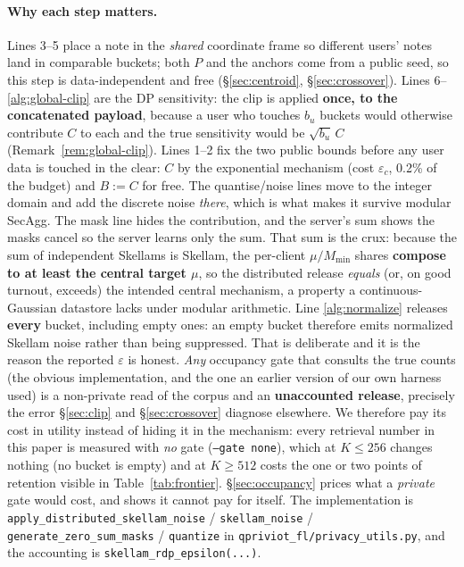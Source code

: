 \documentclass[pdflatex,sn-mathphys-num,iicol]{sn-jnl}
\theoremstyle{thmstyleone}%
\theoremstyle{thmstyletwo}%
\theoremstyle{thmstylethree}%
\newcommand{\eps}{\varepsilon}
\newcommand{\secref}[1]{\S\ref{#1}}
\begin{document}
\paragraph{Why each step matters.} Lines 3--5 place a note in the \emph{shared}
coordinate frame so different users' notes land in comparable buckets; both $P$ and the
anchors come from a public seed, so this step is data-independent and free
(\secref{sec:centroid}, \secref{sec:crossover}). Lines 6--\ref{alg:global-clip} are the
DP sensitivity: the clip is applied \textbf{once, to the concatenated payload}, because
a user who touches $b_u$ buckets would otherwise contribute $C$ to each and the true
sensitivity would be $\sqrt{b_u}\,C$ (Remark~\ref{rem:global-clip}). Lines 1--2 fix the
two public bounds before any user data is touched in the clear: $C$ by the exponential
mechanism (cost $\eps_c$, 0.2\% of the budget) and $B := C$ for free. The quantise/noise
lines move to the integer domain and add the discrete noise \emph{there}, which is what
makes it survive modular SecAgg. The mask line hides the contribution, and the server's
sum shows the masks cancel so the server learns only the sum. That sum is the crux:
because the sum of independent Skellams is Skellam, the per-client $\mu/M_{\min}$ shares
\textbf{compose to at least the central target $\mu$}, so the distributed release
\emph{equals} (or, on good turnout, exceeds) the intended central mechanism, a
property a continuous-Gaussian datastore lacks under modular arithmetic. Line
\ref{alg:normalize} releases \textbf{every} bucket, including empty ones: an empty bucket
therefore emits normalized Skellam noise rather than being suppressed. That is deliberate
and it is the reason the reported $\eps$ is honest. \emph{Any} occupancy gate that consults
the true counts (the obvious implementation, and the one an earlier version of our own
harness used) is a non-private read of the corpus and an \textbf{unaccounted release},
precisely the error \secref{sec:clip} and \secref{sec:crossover} diagnose elsewhere. We
therefore pay its cost in utility instead of hiding it in the mechanism: every retrieval
number in this paper is measured with \emph{no} gate (\texttt{--gate none}), which at
$K \leq 256$ changes nothing (no bucket is empty) and at $K \geq 512$ costs the one or two
points of retention visible in Table~\ref{tab:frontier}. \secref{sec:occupancy} prices what
a \emph{private} gate would cost, and shows it cannot pay for itself. The implementation is
\texttt{apply\_distributed\_skellam\_noise} / \texttt{skellam\_noise} /
\texttt{generate\_zero\_sum\_masks} / \texttt{quantize} in
\texttt{qpriviot\_fl/privacy\_utils.py}, and the accounting is
\texttt{skellam\_rdp\_epsilon(...)}.
\end{document}
